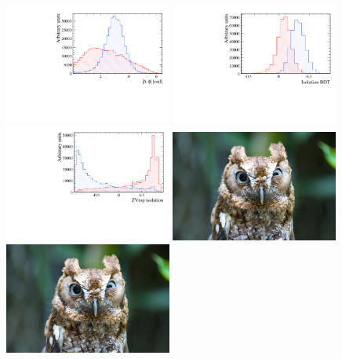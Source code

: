 \begin{figure}[htbp]
  \centering
    \includegraphics[width=0.49\textwidth]{./Figs/Appendix2/phi.pdf}
    \includegraphics[width=0.49\textwidth]{./Figs/Appendix2/isoBDT.pdf}
    \includegraphics[width=0.49\textwidth]{./Figs/Appendix2/ZViso.pdf}
    \includegraphics[width=0.49\textwidth]{./Figs/placeholder.jpeg}
    \includegraphics[width=0.49\textwidth]{./Figs/placeholder.jpeg}

\end{figure}
